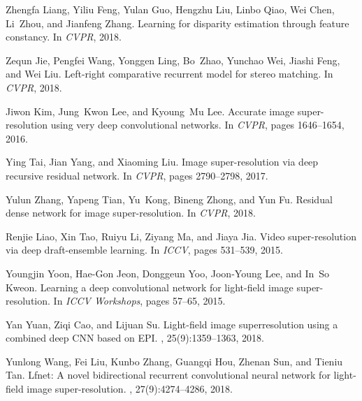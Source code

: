 \documentclass[10pt,twocolumn,letterpaper]{article}
\begin{document}
\begin{thebibliography}{10}
	Zhengfa Liang, Yiliu Feng, Yulan Guo, Hengzhu Liu, Linbo Qiao, Wei Chen,
	Li~Zhou, and Jianfeng Zhang.
	\newblock Learning for disparity estimation through feature constancy.
	\newblock In {\em CVPR}, 2018.
	
	Zequn Jie, Pengfei Wang, Yonggen Ling, Bo~Zhao, Yunchao Wei, Jiashi Feng, and
	Wei Liu.
	\newblock Left-right comparative recurrent model for stereo matching.
	\newblock In {\em CVPR}, 2018.
	
	Jiwon Kim, Jung~Kwon Lee, and Kyoung~Mu Lee.
	\newblock Accurate image super-resolution using very deep convolutional
	networks.
	\newblock In {\em CVPR}, pages 1646--1654, 2016.
	
	Ying Tai, Jian Yang, and Xiaoming Liu.
	\newblock Image super-resolution via deep recursive residual network.
	\newblock In {\em CVPR}, pages 2790--2798, 2017.
	
	Yulun Zhang, Yapeng Tian, Yu~Kong, Bineng Zhong, and Yun Fu.
	\newblock Residual dense network for image super-resolution.
	\newblock In {\em CVPR}, 2018.
	
	Renjie Liao, Xin Tao, Ruiyu Li, Ziyang Ma, and Jiaya Jia.
	\newblock Video super-resolution via deep draft-ensemble learning.
	\newblock In {\em ICCV}, pages 531--539, 2015.
	
	Youngjin Yoon, Hae{-}Gon Jeon, Donggeun Yoo, Joon{-}Young Lee, and In~So Kweon.
	\newblock Learning a deep convolutional network for light-field image
	super-resolution.
	\newblock In {\em ICCV Workshops}, pages 57--65, 2015.
	
	Yan Yuan, Ziqi Cao, and Lijuan Su.
	\newblock Light-field image superresolution using a combined deep {CNN} based
	on {EPI}.
	, 25(9):1359--1363, 2018.
	
	Yunlong Wang, Fei Liu, Kunbo Zhang, Guangqi Hou, Zhenan Sun, and Tieniu Tan.
	\newblock Lfnet: {A} novel bidirectional recurrent convolutional neural network
	for light-field image super-resolution.
	, 27(9):4274--4286, 2018.
	

\end{thebibliography}
\end{document}

